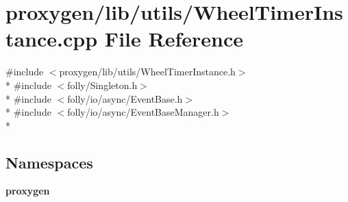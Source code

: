 \section{proxygen/lib/utils/\+Wheel\+Timer\+Instance.cpp File Reference}
\label{WheelTimerInstance_8cpp}
{\ttfamily \#include $<$proxygen/lib/utils/\+Wheel\+Timer\+Instance.\+h$>$}\\*
{\ttfamily \#include $<$folly/\+Singleton.\+h$>$}\\*
{\ttfamily \#include $<$folly/io/async/\+Event\+Base.\+h$>$}\\*
{\ttfamily \#include $<$folly/io/async/\+Event\+Base\+Manager.\+h$>$}\\*
\subsection*{Namespaces}
\begin{DoxyCompactItemize}
\item 
 {\bf proxygen}
\end{DoxyCompactItemize}
